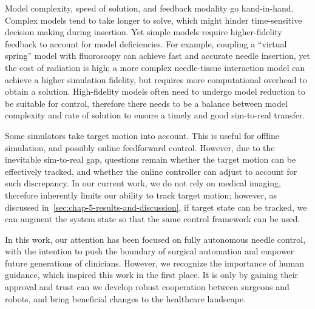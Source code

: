 Model complexity, speed of solution, and feedback modality go hand-in-hand. Complex models tend to take longer to solve, which might hinder time-sensitive decision making during insertion. Yet simple models require higher-fidelity feedback to account for model deficiencies. For example, coupling a ``virtual spring'' model with fluoroscopy can achieve fast and accurate needle insertion, yet the cost of radiation is high; a more complex needle-tissue interaction model can achieve a higher simulation fidelity, but requires more computational overhead to obtain a solution. High-fidelity models often need to undergo model reduction to be suitable for control, therefore there needs to be a balance between model complexity and rate of solution to ensure a timely and good sim-to-real transfer.

Some simulators take target motion into account. This is useful for offline simulation, and possibly online feedforward control. However, due to the inevitable sim-to-real gap, questions remain whether the target motion can be effectively tracked, and whether the online controller can adjust to account for such discrepancy. In our current work, we do not rely on medical imaging, therefore inherently limits our ability to track target motion; however, as discussed in~\cref{sec:chap-5-results-and-discussion}, if target state can be tracked, we can augment the system state so that the same control framework can be used.

In this work, our attention has been focused on fully autonomous needle control, with the intention to push the boundary of surgical automation and empower future generations of clinicians. However, we recognize the importance of human guidance, which inspired this work in the first place. It is only by gaining their approval and trust can we develop robust cooperation between surgeons and robots, and bring beneficial changes to the healthcare landscape.

